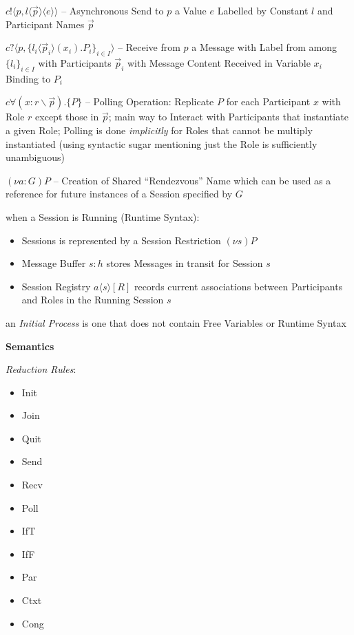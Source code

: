 $c!\langle{p,l\langle{\vec{p}}\rangle\langle{e}\rangle}\rangle$ --
Asynchronous Send to $p$ a Value $e$ Labelled by Constant $l$ and
Participant Names $\vec{p}$

$c?\langle{p, \{l_i\langle{\vec{p}_i}\rangle(x_i).P_i\}_{i \in
    I}}\rangle$ -- Receive from $p$ a Message with Label from among
$\{l_i\}_{i \in I}$ with Participants $\vec{p}_i$ with Message Content
Received in Variable $x_i$ Binding to $P_i$

$c\forall(x:r \backslash \vec{p}).\{P\}$ -- Polling Operation:
Replicate $P$ for each Participant $x$ with Role $r$ except those in
$\vec{p}$; main way to Interact with Participants that instantiate a
given Role; Polling is done \emph{implicitly} for Roles that cannot be
multiply instantiated (using syntactic sugar mentioning just the Role
is sufficiently unambiguous)

$(\nu a:G)P$ -- Creation of Shared ``Rendezvous'' Name which can be
used as a reference for future instances of a Session specified by $G$

when a Session is Running (Runtime Syntax):
\begin{itemize}
  \item Sessions is represented by a Session Restriction $(\nu s)P$
  \item Message Buffer $s:h$ stores Messages in transit for Session
    $s$
  \item Session Registry $a\langle{s}\rangle[R]$ records current
    associations between Participants and Roles in the Running Session
    $s$
\end{itemize}

an \emph{Initial Process} is one that does not contain Free Variables
or Runtime Syntax


\textbf{Semantics}

\emph{Reduction Rules}:
\begin{itemize}
  \item Init
  \item Join
  \item Quit
  \item Send
  \item Recv
  \item Poll
  \item IfT
  \item IfF
  \item Par
  \item Ctxt
  \item Cong
\end{itemize}

